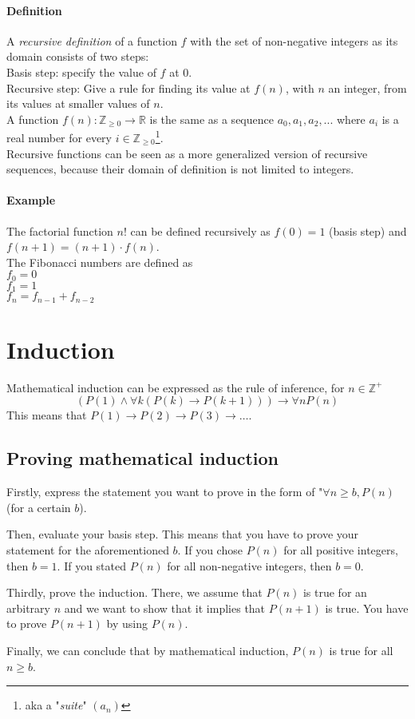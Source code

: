\documentclass[10pt,a4paper]{book}
\newcommand{\R}{\mathbb{R}}
\newcommand{\Z}{\mathbb{Z}}
\newcommand{\ind}{\hspace*{\parindent}}
\begin{document}
\paragraph*{Definition}
A \textit{recursive definition} of a function $f$ with the set of non-negative integers as its domain consists of two steps:\\
\ind Basis step: specify the value of $f$ at 0.\\
\ind Recursive step: Give a rule for finding its value at $f(n)$, with $n$ an integer, from its values at smaller values of $n$.\\
A function $f(n): \Z_{\geqslant 0} \to \R$ is the same as a sequence $a_0,a_1,a_2,...$ where $a_i$ is a real number for every $i \in \Z_{\geqslant 0}$\footnote{aka a "\textit{suite}" $(a_n)$}.\\
Recursive functions can be seen as a more generalized version of recursive sequences, because their domain of definition is not limited to integers.
\paragraph*{Example}
The factorial function $n!$ can be defined recursively as $f(0)=1$ (basis step) and $f(n+1)=(n+1)\cdot f(n)$.\\
The Fibonacci numbers are defined as\\
$f_{0}=0$\\$f_{1}=1$\\$f_{n}=f_{n-1}+f_{n-2}$
\section{Induction}
Mathematical induction can be expressed as the rule of inference, for $n\in\Z^+$
\[(P(1)\land\forall k(P(k)\to P(k+1)))\to\forall nP(n)\]
This means that $P(1)\to P(2)\to P(3)\to\ldots$.
\subsection{Proving mathematical induction}
Firstly, express the statement you want to prove in the form of "$\forall n\geq b,P(n)$ (for a certain $b$).\par
Then, evaluate your basis step. This means that you have to prove your statement for the aforementioned $b$. If you chose $P(n)$ for all positive integers, then $b=1$. If you stated $P(n)$ for all non-negative integers, then $b=0$. \par 
Thirdly, prove the induction. There, we assume that $P(n)$ is true for an arbitrary $n$ and we want to show that it implies that $P(n+1)$ is true. You have to prove $P(n+1)$ by using $P(n)$.\par 
Finally, we can conclude that by mathematical induction, $P(n)$ is true for all $n\geq b$.
\end{document}

